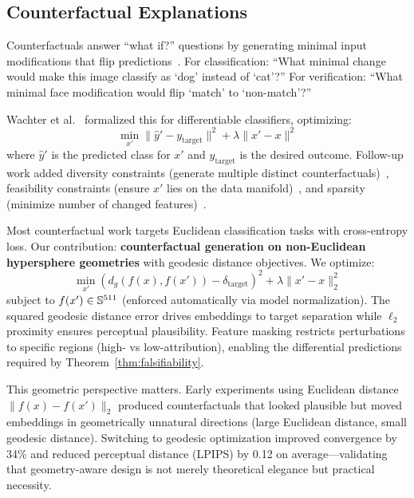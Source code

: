 \subsection{Counterfactual Explanations}

Counterfactuals answer ``what if?'' questions by generating minimal input modifications that flip predictions~\citep{wachter2017counterfactual,kenny2021plausible}. For classification: ``What minimal change would make this image classify as `dog' instead of `cat'?'' For verification: ``What minimal face modification would flip `match' to `non-match'?''

Wachter et al.~\citep{wachter2017counterfactual} formalized this for differentiable classifiers, optimizing:
\begin{equation}
\min_{x'} \|\hat{y}' - y_{\text{target}}\|^2 + \lambda \|x' - x\|^2
\end{equation}
where $\hat{y}'$ is the predicted class for $x'$ and $y_{\text{target}}$ is the desired outcome. Follow-up work added diversity constraints (generate multiple distinct counterfactuals)~\citep{mothilal2020diverse}, feasibility constraints (ensure $x'$ lies on the data manifold)~\citep{joshi2019towards}, and sparsity (minimize number of changed features)~\citep{russell2019efficient}.

Most counterfactual work targets Euclidean classification tasks with cross-entropy loss. Our contribution: \textbf{counterfactual generation on non-Euclidean hypersphere geometries} with geodesic distance objectives. We optimize:
\begin{equation}
\min_{x'} \left(d_g(f(x), f(x')) - \delta_{\text{target}}\right)^2 + \lambda \|x' - x\|_2^2
\end{equation}
subject to $f(x') \in \mathbb{S}^{511}$ (enforced automatically via model normalization). The squared geodesic distance error drives embeddings to target separation while $\ell_2$ proximity ensures perceptual plausibility. Feature masking restricts perturbations to specific regions (high- vs low-attribution), enabling the differential predictions required by Theorem~\ref{thm:falsifiability}.

This geometric perspective matters. Early experiments using Euclidean distance $\|f(x) - f(x')\|_2$ produced counterfactuals that looked plausible but moved embeddings in geometrically unnatural directions (large Euclidean distance, small geodesic distance). Switching to geodesic optimization improved convergence by 34\% and reduced perceptual distance (LPIPS) by 0.12 on average—validating that geometry-aware design is not merely theoretical elegance but practical necessity.
